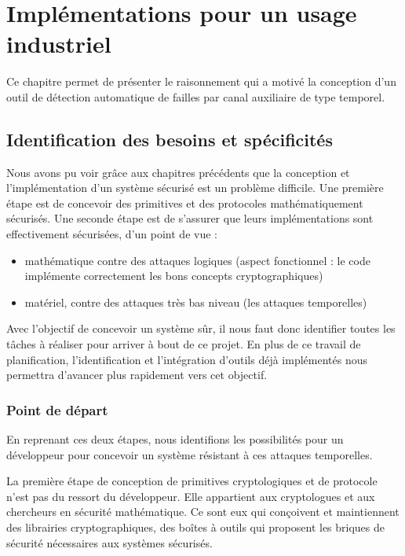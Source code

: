 \chapter{Implémentations pour un usage industriel}
\label{chap:erysichtonConception}


Ce chapitre permet de présenter le raisonnement qui a motivé la conception d'un outil de détection automatique de failles par canal auxiliaire de type temporel.

\section{Identification des besoins et spécificités}

Nous avons pu voir grâce aux chapitres précédents que la conception et l'implémentation d'un système sécurisé est un problème difficile. Une première étape est de concevoir des primitives et des protocoles mathématiquement sécurisés. Une seconde étape est de s’assurer que leurs implémentations sont effectivement sécurisées, d'un point de vue : 

\begin{itemize}
    \item mathématique contre des attaques logiques (aspect fonctionnel : le code implémente correctement les bons concepts cryptographiques)
    \item matériel, contre des attaques très bas niveau (les attaques temporelles)
\end{itemize}

Avec l'objectif de concevoir un système sûr, il nous faut donc identifier toutes les tâches à réaliser pour arriver à bout de ce projet. En plus de ce travail de planification, l'identification et l'intégration d'outils déjà implémentés nous permettra d'avancer plus rapidement vers cet objectif.\smallbreak


\subsection*{Point de départ}

En reprenant ces deux étapes, nous identifions les possibilités pour un développeur pour concevoir un système résistant à ces attaques temporelles.\smallbreak

La première étape de conception de primitives cryptologiques et de protocole n'est pas du ressort du développeur. Elle appartient aux cryptologues et aux chercheurs en sécurité mathématique. Ce sont eux qui conçoivent et maintiennent des librairies cryptographiques, des boîtes à outils qui proposent les briques de sécurité nécessaires aux systèmes sécurisés.\medbreak


